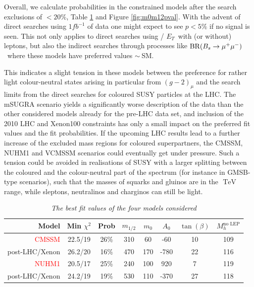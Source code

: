 \documentclass[cits]{PoS}
\newcommand{\br}{{\rm BR}}
\newcommand{\bmm}{\ensuremath{\br(B_s \to \mu^+\mu^-)}\ }
\newcommand{\tev}{\,\, \mathrm{TeV}}
\newcommand{\ETslash}{/ \hspace{-.8em}\ensuremath{E_T}\ }
\begin{document}
Overall, we calculate probabilities in the constrained models after the search
exclusions of $<20\%$, Table \ref{tab:bf} and Figure \ref{fig:m0m12pval}. With the
advent of direct searches using $1fb^{-1}$ of data one might expect to see
$p<5\%$ if no signal is seen.  This not only applies to direct searches using 
\ETslash with (or without) leptons, but also the indirect searches through processes 
like \bmm where these models have preferred values $\sim\ $SM.

This indicates a slight tension in these models between the preference for rather light colour-neutral states
arising in particular from $(g-2)_{\mu}$ and the search limits from the direct searches for coloured SUSY
particles at the LHC. The mSUGRA scenario yields a significantly worse description of the data
than the other considered models already for the pre-LHC data set, and inclusion of the 2010 LHC
and Xenon100 constraints has only a small impact on the preferred fit values and the fit probabilities. 
If the upcoming LHC results lead to a further increase of the excluded mass regions for coloured superpartners,
the CMSSM, NUHM1 and VCMSSM scenarios could eventually get under pressure. Such a tension could be avoided in
realisations of SUSY with a larger splitting between the coloured and the colour-neutral part of the spectrum 
(for instance in GMSB-type scenarios), such that the masses of squarks and gluinos are in the $\tev$ range, 
while sleptons, neutralinos and charginos can still be light.


\begin{table}[htb!]
    \begin{center}
        \begin{tabular}{|r||c|c|c|c|c|c||c|}
          \hline
          Model & Min $\chi^{2}$ & Prob & $m_{1/2}$ & $m_{0}$ & $A_{0}$ &
          $\tan\left(\beta\right)$ & $M_{h}^{\textrm{no LEP}}$  \\
          \hline\hline
          \textcolor{red}{CMSSM} & 22.5/19 & 26\% & 310 & 60 & -60 & 10 & 109 \\
           post-LHC/Xenon & 26.2/20 & 16\% & 470 & 170 & -780 & 22 & 116 \\
          \hline  
          \textcolor{red}{NUHM1} & 20.5/17 & 25\% & 240 & 100 & 920 & 7 & 119 \\
           post-LHC/Xenon & 24.2/19 & 19\% & 530 & 110 & -370 & 27 & 118 \\
          \hline
        \end{tabular}
    \end{center}
    \caption{\it 
        The best fit values of the four models considered
        }
    \label{tab:bf}
\end{table}
\end{document}
